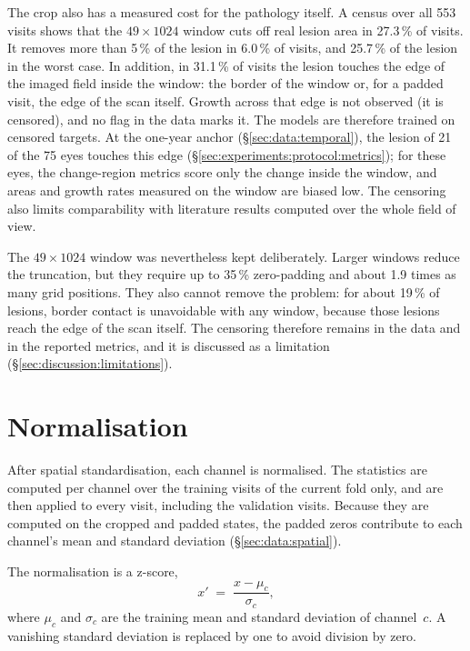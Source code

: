 The crop also has a measured cost for the pathology itself. A census
over all 553 visits shows that the $49 \times 1024$ window cuts off real
lesion area in 27.3\,\% of visits. It removes more than 5\,\% of the
lesion in 6.0\,\% of visits, and 25.7\,\% of the lesion in the worst
case. In addition, in 31.1\,\% of visits the lesion touches the edge of
the imaged field inside the window: the border of the window or, for a
padded visit, the edge of the scan itself. Growth across that edge is
not observed (it is censored), and no flag in the data marks it. The models
are therefore trained on censored targets. At the one-year anchor
(\S\ref{sec:data:temporal}), the lesion of 21 of the 75 eyes touches this
edge (\S\ref{sec:experiments:protocol:metrics}); for these eyes, the
change-region metrics score only the change inside the window, and areas
and growth rates measured on the window are biased low. The censoring also limits
comparability with literature results computed over the whole field of
view.

The $49 \times 1024$ window was nevertheless kept deliberately. Larger windows reduce the
truncation, but they require up to 35\,\% zero-padding and about 1.9
times as many grid positions. They also cannot remove the problem: for
about 19\,\% of lesions, border contact is unavoidable with any window,
because those lesions reach the edge of the scan itself. The censoring
therefore remains in the data and in the reported metrics, and it is
discussed as a limitation (\S\ref{sec:discussion:limitations}).


\section{Normalisation}
\label{sec:data:normalization}

After spatial standardisation, each channel is normalised. The
statistics are computed per channel over the training visits of the
current fold only, and are then applied to every visit, including the
validation visits. Because they are computed on the cropped and padded states, the padded zeros
contribute to each channel's mean and standard deviation
(\S\ref{sec:data:spatial}).

The normalisation is a z-score,
\[
  x' \;=\; \frac{x - \mu_c}{\sigma_c},
\]
where $\mu_c$ and $\sigma_c$ are the training mean and standard
deviation of channel~$c$. A vanishing standard deviation is replaced by
one to avoid division by zero.

